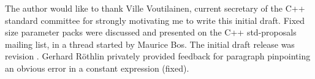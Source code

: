 
The author would like to thank Ville Voutilainen, current secretary of the C++ standard committee for strongly motivating me to write this initial draft.
Fixed size parameter packs were discussed and presented on the C++ std-proposals mailing\cite{Bos2014} list, in a thread started by Maurice Bos.
The initial draft release was revision {\color{magenta}{7d4fb49}}\cite{Mak2014b}. Gerhard Röthlin privately provided feedback for
paragraph {\color{magenta}{7d4fb49/63}} pinpointing an obvious error in a constant expression (fixed).